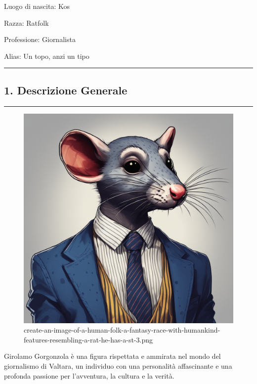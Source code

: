 Luogo di nascita: Kos

Razza: Ratfolk

Professione: Giornalista

Alias: Un topo, anzi un tipo

\begin{center}\rule{0.5\linewidth}{0.5pt}\end{center}

\subsection{1. Descrizione Generale}\label{descrizione-generale}

\begin{center}\rule{0.5\linewidth}{0.5pt}\end{center}

\begin{figure}
\centering
\includegraphics{create-an-image-of-a-human-folk-a-fantasy-race-with-humankind-features-resembling-a-rat-he-has-a-st-3.png}
\caption{create-an-image-of-a-human-folk-a-fantasy-race-with-humankind-features-resembling-a-rat-he-has-a-st-3.png}
\end{figure}

Girolamo Gorgonzola è una figura rispettata e ammirata nel mondo del
giornalismo di Valtara, un individuo con una personalità affascinante e
una profonda passione per l'avventura, la cultura e la verità.

